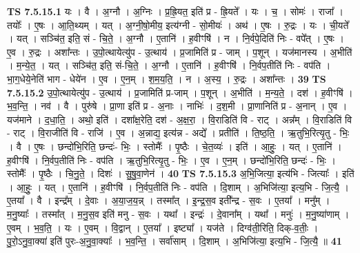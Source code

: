 \documentclass[17pt]{extarticle}
\begin{document}
                                \textbf{ TS 7.5.15.1} \newline
                  यः । वै । अ॒ग्नौ । अ॒ग्निः । प्र॒ह्रि॒यत॒ इति॑ प्र - ह्रि॒यते᳚ । यः । च॒ । सोमः॑ । राजा᳚ । तयोः᳚ । ए॒षः । आ॒ति॒थ्यम् । यत् । अ॒ग्नी॒षो॒मीय॒ इत्य॑ग्नी - सो॒मीयः॑ । अथ॑ । ए॒षः । रु॒द्रः । यः । ची॒यते᳚ । यत् । सञ्चि॑त॒ इति॒ सं - चि॒ते॒ । अ॒ग्नौ । ए॒तानि॑ । ह॒वीꣳषि॑ । न । नि॒र्वपे॒दिति॑ निः - वपे᳚त् । ए॒षः । ए॒व । रु॒द्रः । अशा᳚न्तः । उ॒पो॒त्थायेत्यु॑प - उ॒त्थाय॑ । प्र॒जामिति॑ प्र - जाम् । प॒शून् । यज॑मानस्य । अ॒भीति॑ । म॒न्ये॒त॒ । यत् । सञ्चि॑त॒ इति॒ सं-चि॒ते॒ । अ॒ग्नौ । ए॒तानि॑ । ह॒वीꣳषि॑ । नि॒र्वप॒तीति॑ निः - वप॑ति । भा॒ग॒धेये॒नेति॑ भाग - धेये॑न । ए॒व । ए॒न॒म् । श॒म॒य॒ति॒ । न । अ॒स्य॒ । रु॒द्रः । अशा᳚न्तः । \textbf{  39} \newline
                  \newline
                                \textbf{ TS 7.5.15.2} \newline
                  उ॒पो॒त्थायेत्यु॑प - उ॒त्थाय॑ । प्र॒जामिति॑ प्र-जाम् । प॒शून् । अ॒भीति॑ । म॒न्य॒ते॒ । दश॑ । ह॒वीꣳषि॑ । भ॒व॒न्ति॒ । नव॑ । वै । पुरु॑षे । प्रा॒णा इति॑ प्र - अ॒नाः । नाभिः॑ । द॒श॒मी । प्रा॒णानिति॑ प्र - अ॒नान् । ए॒व । यज॑माने । द॒धा॒ति॒ । अथो॒ इति॑ । दशा᳚क्ष॒रेति॒ दश॑ - अ॒क्ष॒रा॒ । वि॒राडिति॑ वि - राट् । अन्न᳚म् । वि॒राडिति॑ वि - राट् । वि॒राजीति॑ वि - राजि॑ । ए॒व । अ॒न्नाद्य॒ इत्य॑न्न - अद्ये᳚ । प्रतीति॑ । ति॒ष्ठ॒ति॒ । ऋ॒तुभि॒रित्यृ॒तु - भिः॒ । वै । ए॒षः । छन्दो॑भि॒रिति॒ छन्दः॑- भिः॒ । स्तोमैः᳚ । पृ॒ष्ठैः । चे॒त॒व्यः॑ । इति॑ । आ॒हुः॒ । यत् । ए॒तानि॑ । ह॒वीꣳषि॑ । नि॒र्वप॒तीति॑ निः - वप॑ति । ऋ॒तुभि॒रित्यृ॒तु - भिः॒ । ए॒व । ए॒न॒म् । छन्दो॑भि॒रिति॒ छन्दः॑ - भिः॒ । स्तोमैः᳚ । पृ॒ष्ठैः । चि॒नु॒ते॒ । दिशः॑ । सु॒षु॒वा॒णेन॑ । \textbf{  40} \newline
                  \newline
                                \textbf{ TS 7.5.15.3} \newline
                  अ॒भि॒जित्या॒ इत्य॑भि - जित्याः᳚ । इति॑ । आ॒हुः॒ । यत् । ए॒तानि॑ । ह॒वीꣳषि॑ । नि॒र्वप॒तीति॑ निः - वप॑ति । दि॒शाम् । अ॒भिजि॑त्या॒ इत्य॒भि - जि॒त्यै॒ । ए॒तया᳚ । वै । इन्द्र᳚म् । दे॒वाः । अ॒या॒ज॒य॒न्न् । तस्मा᳚त् । इ॒न्द्र॒स॒व इती᳚न्द्र - स॒वः । ए॒तया᳚ । मनु᳚म् । म॒नु॒ष्याः᳚ । तस्मा᳚त् । म॒नु॒स॒व इति॑ मनु - स॒वः । यथा᳚ । इन्द्रः॑ । दे॒वाना᳚म् । यथा᳚ । मनुः॑ । म॒नु॒ष्या॑णाम् । ए॒वम् । भ॒व॒ति॒ । यः । ए॒वम् । वि॒द्वान् । ए॒तया᳚ । इष्ट्या᳚ । यज॑ते । दिग्व॑ती॒रिति॒ दिक्-व॒तीः॒ । पु॒रो॒ऽनु॒वा॒क्या॑ इति॑ पुरः-अ॒नु॒वा॒क्याः᳚ । भ॒व॒न्ति॒ । सर्वा॑साम् । दि॒शाम् । अ॒भिजि॑त्या॒ इत्य॒भि - जि॒त्यै॒ ॥ \textbf{  41} \newline
\end{document}
